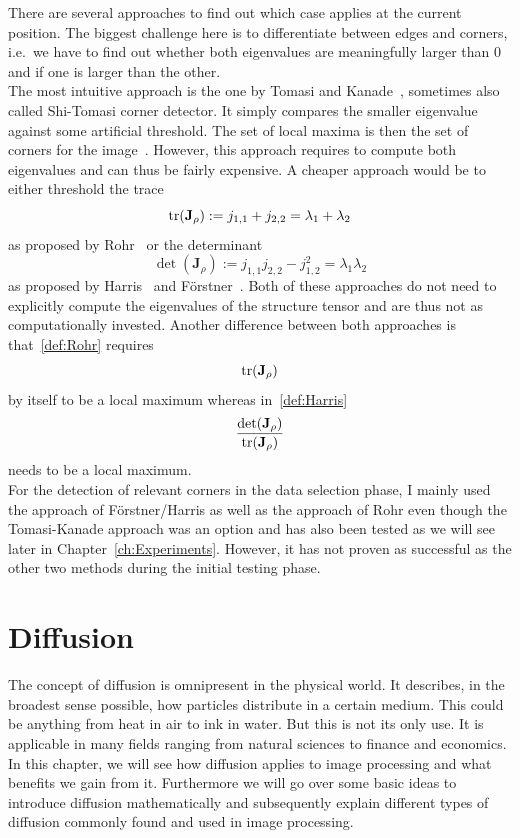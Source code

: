 There are several approaches to find out which case applies at the current position. The biggest
challenge here is to differentiate between edges and corners, i.e.\ we have to find out whether both
eigenvalues are meaningfully larger than 0 and if one is larger than the other.\\
The most intuitive approach is the one by Tomasi and Kanade~\cite{tomasi91}, sometimes also called Shi-Tomasi
corner detector. It simply compares the smaller eigenvalue against some artificial
threshold. The set of local maxima is then the set of corners for the image~\cite{shitomasi94}.
However, this approach requires to compute both eigenvalues and can thus be fairly expensive.
A cheaper approach would be to either threshold the trace 
\begin{equation}
    \operatorname{tr}(\mathbf{J}_\rho) := j_{1, 1} + j_{2,
    2} = \lambda_1 + \lambda_2\label{def:Rohr}
\end{equation} 
as proposed by Rohr~\cite{rohr91} or the determinant 
\begin{equation}
    \det(\mathbf{J}_\rho) := j_{1, 1}j_{2, 2} -
    j_{1, 2}^2 = \lambda_1\lambda_2\label{def:Harris}
\end{equation} 
as proposed by Harris~\cite{harris88} and Förstner~\cite{foerstner87}. Both of these approaches do 
not need to explicitly compute the eigenvalues of the structure tensor and are thus not as 
computationally invested. Another difference between both approaches is that~\eqref{def:Rohr} 
requires 
\begin{equation}
    \operatorname{tr}(\mathbf{J}_\rho)
\end{equation}
by itself to be a local maximum whereas in~\eqref{def:Harris}
\begin{equation}
    \frac{\det(\mathbf{J}_\rho)}{\operatorname{tr}(\mathbf{J}_\rho)}
\end{equation} 
needs to be a local maximum.\\
For the detection of relevant corners in the data selection phase, I mainly used the approach of F\"orstner/Harris as well as
the approach of Rohr even though the Tomasi-Kanade approach was an option and has also been
tested as we will see later in Chapter~\ref{ch:Experiments}. However, it has not proven as successful
as the other two methods during the initial testing phase.
\section{Diffusion}\label{sec:Diffusion}
The concept of diffusion is omnipresent in the physical world. It describes, in the broadest sense
possible, how particles distribute in a certain medium. This could be anything from heat in air to
ink in water. But this is not its only use. It is applicable in many fields ranging from
natural sciences to finance and economics. In this chapter, we will see how diffusion applies to
image processing and what benefits we gain from it. Furthermore we will go over some basic ideas to
introduce diffusion mathematically and subsequently explain different types of diffusion commonly
found and used in image processing.
